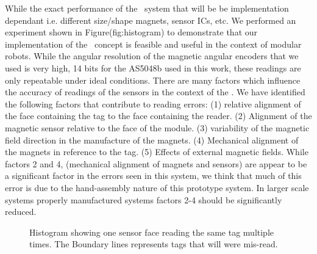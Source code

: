 While the exact performance of the \tagName~system that will be be implementation dependant i.e. different size/shape magnets, sensor ICs, etc. We performed an experiment shown in Figure(fig:histogram) to demonstrate that our implementation of the \tagName~concept is feasible and useful in the context of modular robots. While the angular resolution of the magnetic angular encoders that we used is very high, 14 bits for the AS5048b used in this work, these readings are only repeatable under ideal conditions. There are many factors which influence the accuracy of readings of the sensors in the context of the \tagNamePlural. We have identified the following factors that contribute to reading errors: (1) relative alignment of the face containing the tag to the face containing the reader. (2) Alignment of the magnetic sensor relative to the face of the module. (3) variability of the magnetic field direction in the manufacture of the magnets. (4) Mechanical alignment of the magnets in reference to the tag. (5) Effects of external magnetic fields. While factors 2 and 4, (mechanical alignment of magnets and sensors) are appear to be a significant factor in the errors seen in this system, we think that much of this error is due to the hand-assembly nature of this prototype system. In larger scale systems properly manufactured systems factors 2-4 should be significantly reduced.

\begin{figure}[h]
	
	\caption{Histogram showing one sensor face reading the same tag multiple times. The Boundary lines represents tags that will were mis-read.}
	\label{fig:histogram}
\end{figure}


%	
